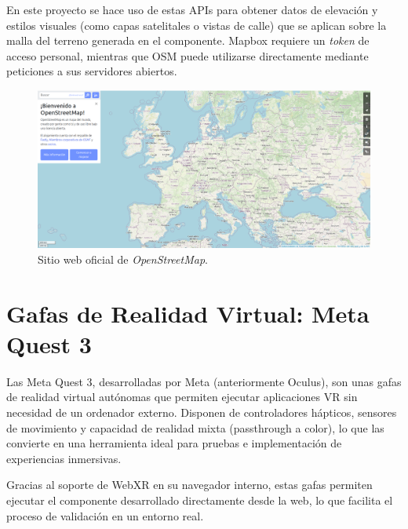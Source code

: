 \documentclass[a4paper, 12pt]{book}
\begin{document}
En este proyecto se hace uso de estas APIs para obtener datos de elevación y estilos visuales (como capas satelitales o vistas de calle) que se aplican sobre la malla del terreno generada en el componente. Mapbox requiere un \textit{token} de acceso personal, mientras que OSM puede utilizarse directamente mediante peticiones a sus servidores abiertos.

\begin{figure}[H]
  \centering
  \includegraphics[width=\textwidth]{img/osm.png}
  \caption{Sitio web oficial de \textit{OpenStreetMap}.}
  \label{fig:osm}
\end{figure}



\section{Gafas de Realidad Virtual: Meta Quest 3}
\label{sec:gafas}

Las Meta Quest 3, desarrolladas por Meta (anteriormente Oculus), son unas gafas de realidad virtual autónomas que permiten ejecutar aplicaciones VR sin necesidad de un ordenador externo. Disponen de controladores hápticos, sensores de movimiento y capacidad de realidad mixta (passthrough a color), lo que las convierte en una herramienta ideal para pruebas e implementación de experiencias inmersivas.

Gracias al soporte de WebXR en su navegador interno, estas gafas permiten ejecutar el componente desarrollado directamente desde la web, lo que facilita el proceso de validación en un entorno real.
\end{document}
